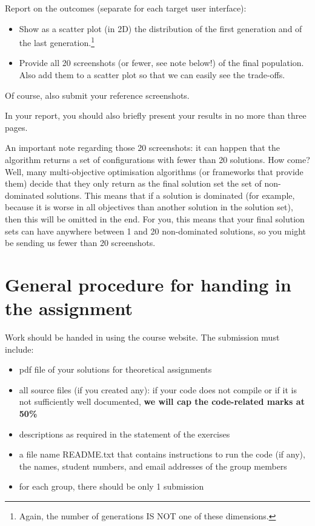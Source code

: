 \documentclass{pracs}
\begin{document}
Report on the outcomes (separate for each target user interface):
\begin{itemize}
\item Show as a scatter plot (in 2D) the distribution of the first generation and of the last generation.\footnote{Again, the number of generations IS NOT one of these dimensions.}
\item Provide all 20 screenshots (or fewer, see note below!) of the final population. Also add them to a scatter plot so that we can easily see the trade-offs.
\end{itemize}

Of course, also submit your reference screenshots.

In your report, you should also briefly present your results in no more than three pages.

An important note regarding those 20 screenshots: it can happen that the algorithm returns a set of configurations with fewer than 20 solutions. How come? Well, many multi-objective optimisation algorithms (or frameworks that provide them) decide that they only return as the final solution set the set of non-dominated solutions. This means that if a solution is dominated (for example, because it is worse in all objectives than another solution in the solution set), then this will be omitted in the end. For you, this means that your final solution sets can have anywhere between 1 and 20 non-dominated solutions, so you might be sending us fewer than 20 screenshots.


\section{General procedure for handing in the assignment}
Work should be handed in using the course website. The submission must include:
\begin{itemize}
\item pdf file of your solutions for theoretical assignments
\item all source files (if you created any): if your code does not compile or if it is not sufficiently well documented, \textbf{we will cap the code-related marks at 50\%}
\item descriptions as required in the statement of the exercises
\item a file name README.txt that contains instructions to run the code (if any), the names, student numbers, and email addresses of the group members
\item for each group, there should be only 1 submission
\end{itemize}
\end{document}
